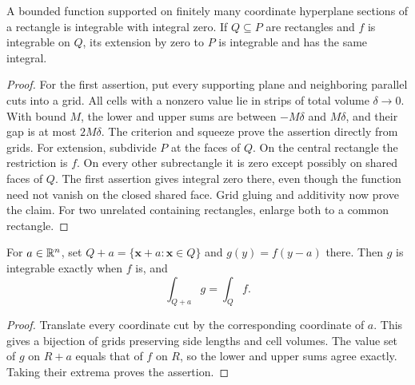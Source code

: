 \begin{lemma}\label{lem:rectangle-zero-extension}
A bounded function supported on finitely many coordinate hyperplane
sections of a rectangle is integrable with integral zero. If $Q\subseteq P$
are rectangles and $f$ is integrable on $Q$, its extension by zero to $P$
is integrable and has the same integral.
\end{lemma}
\begin{proof}
For the first assertion, put every supporting plane and neighboring
parallel cuts into a grid. All cells with a nonzero value lie in strips
of total volume $\delta\to0$. With bound $M$, the lower and upper sums
are between $-M\delta$ and $M\delta$, and their gap is at most $2M\delta$.
The criterion and squeeze prove the assertion directly from grids.
For extension, subdivide $P$ at the faces of $Q$. On the central rectangle
the restriction is $f$. On every other subrectangle it is zero except
possibly on shared faces of $Q$. The first assertion gives integral zero
there, even though the function need not vanish on the closed shared face.
Grid gluing and additivity now prove the claim. For two unrelated
containing rectangles, enlarge both to a common rectangle.
\end{proof}

\begin{lemma}\label{lem:integral-translation}
For $a\in\mathbb{R}^n$, set $Q+a=\{\mathbf{x}+a:\mathbf{x}\in Q\}$ and $g(y)=f(y-a)$ there.
Then $g$ is integrable exactly when $f$ is, and
\[
\int_{Q+a}g=\int_Qf.
\]

\end{lemma}
\begin{proof}
Translate every coordinate cut by the corresponding coordinate of $a$.
This gives a bijection of grids preserving side lengths and cell volumes.
The value set of $g$ on $R+a$ equals that of $f$ on $R$, so the lower
and upper sums agree exactly. Taking their extrema proves the assertion.
\end{proof}

